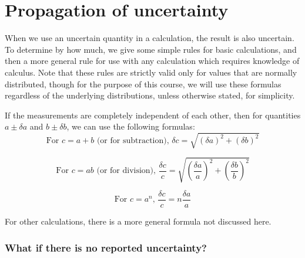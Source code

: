 \section{Propagation of uncertainty}\label{unc:sec:prop}

When we use an uncertain quantity in a calculation, the result is also uncertain. To determine by how much, we give some simple rules for basic calculations, and then a more general rule for use with any calculation which requires knowledge of calculus. Note that these rules are strictly valid only for values that are normally distributed, though for the purpose of this course, we will use these formulas regardless of the underlying distributions, unless otherwise stated, for simplicity.

If the measurements are completely independent of each other, then for quantities $a \pm \delta a$ and $b \pm \delta b$, we can use the following formulas:
\begin{equation}\label{unc:add}
\textrm{For } c = a + b \textrm{ (or for subtraction), } \delta c = \sqrt{(\delta a)^2 + (\delta b)^2}
\end{equation}

\begin{equation}\label{unc:mult}
\textrm{For } c = ab \textrm{ (or for division), } \frac{\delta c}{c} = \sqrt{\left(\frac{\delta a}{a}\right)^2 + \left(\frac{\delta b}{b}\right)^2}
\end{equation}

\begin{equation}\label{unc:exp}
\textrm{For } c = a^n,\, \frac{\delta c}{c} = n \frac{\delta a}{a}
\end{equation}

For other calculations, there is a more general formula not discussed here.


\subsubsection{What if there is no reported uncertainty?}

